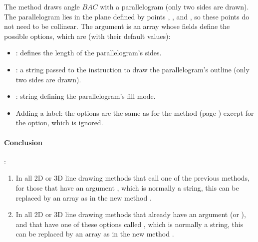 The method  draws angle \(BAC\) with a parallelogram (only two sides are drawn). The parallelogram lies in the plane defined by points , , and , so these points do not need to be collinear. The argument  is an array whose fields define the possible options, which are (with their default values):

\begin{itemize}
    \item {}: defines the length of the parallelogram's sides.

    \item {}: a string passed to the \drawcmd instruction to draw the parallelogram's outline (only two sides are drawn).

    \item {}: string defining the parallelogram's fill mode.

    \item Adding a label: the options are the same as for the  method (page \pageref{dec:dpolyline}) except for the  option, which is ignored.
\end{itemize}

\paragraph{Conclusion}:
\begin{enumerate}
    \item In all 2D or 3D line drawing methods that call one of the previous methods, for those that have an argument , which is normally a string, this can be replaced by an array  as in the new method .

    \item In all 2D or 3D line drawing methods that already have an argument  (or ), and that have one of these options called , which is normally a string, this can be replaced by an array  as in the new method .
\end{enumerate}

